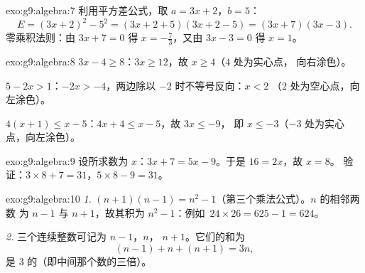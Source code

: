 \begin{solution}{exo:g9:algebra:7}
利用平方差公式，取 $a = 3x + 2$，$b = 5$：
\[
E = (3x + 2)^2 - 5^2 = (3x + 2 + 5)(3x + 2 - 5) = (3x + 7)(3x - 3).
\]
零乘积法则：由 $3x + 7 = 0$ 得 $x = -\frac73$，又由 $3x - 3 = 0$
得 $x = 1$。
\end{solution}

\begin{solution}{exo:g9:algebra:8}
$3x - 4 \geq 8$：$3x \geq 12$，故 $x \geq 4$（$4$ 处为实心点，
向右涂色）。

$5 - 2x > 1$：$-2x > -4$，两边除以 $-2$ 时不等号反向：$x < 2$
（$2$ 处为空心点，向左涂色）。

$4(x+1) \leq x - 5$：$4x + 4 \leq x - 5$，故 $3x \leq -9$，
即 $x \leq -3$（$-3$ 处为实心点，向左涂色）。
\end{solution}

\begin{solution}{exo:g9:algebra:9}
设所求数为 $x$：$3x + 7 = 5x - 9$。于是 $16 = 2x$，故 $x = 8$。
验证：$3 \times 8 + 7 = 31$，$5 \times 8 - 9 = 31$。
\end{solution}

\begin{solution}{exo:g9:algebra:10}
\emph{1.} $(n+1)(n-1) = n^2 - 1$（第三个乘法公式）。$n$ 的相邻两数
为 $n - 1$ 与 $n + 1$，故其积为 $n^2 - 1$：例如\
$24 \times 26 = 625 - 1 = 624$。

\emph{2.} 三个连续整数可记为 $n - 1$，$n$，
$n + 1$。它们的和为
\[
(n-1) + n + (n+1) = 3n ,
\]
是 $3$ 的（即中间那个数的三倍）。
\end{solution}

